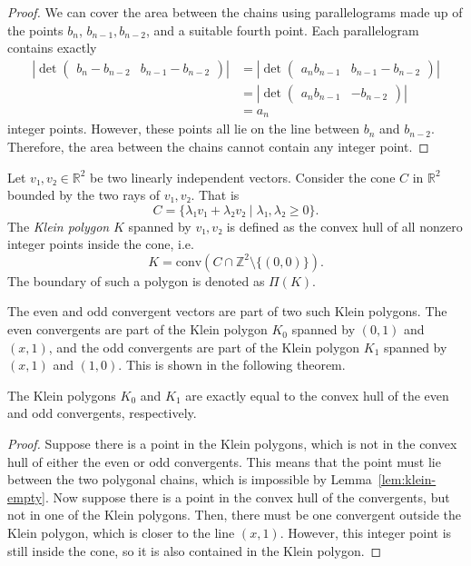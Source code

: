 \begin{proof}
  We can cover the area between the chains
  using parallelograms made up of the points $b_n$, $b_{n-1}, b_{n-2}$, and a suitable fourth point.
  Each parallelogram contains exactly
  \begin{align*}
    |\det\begin{pmatrix}
      b_n - b_{n-2} & b_{n-1} - b_{n-2}
    \end{pmatrix}|
    & = |\det\begin{pmatrix}
      a_n b_{n-1} & b_{n-1} - b_{n-2}
    \end{pmatrix}| \\
    & = |\det\begin{pmatrix}
      a_n b_{n-1} & -b_{n-2}
    \end{pmatrix}| \\
    & = a_n
  \end{align*}
  integer points.
  However, these points all lie on the line between $b_n$ and $b_{n-2}$.
  Therefore, the area between the chains cannot contain any integer point.
\end{proof}

\begin{definition}
  \label{def:klein-polygon}
  Let $v₁, v₂ ∈ ℝ^2$ be two linearly independent vectors.
  Consider the cone $C$ in $ℝ^2$ bounded by the two rays of $v₁, v₂$. That is
  \[
    C = \{ λ₁ v₁ + λ₂ v₂ \mid λ₁, λ₂ ≥ 0 \}.
  \]
  The \emph{Klein polygon} $K$ spanned by $v₁, v₂$ is defined as the convex hull
  of all nonzero integer points inside the cone, i.e.
  \[
    K = \mathrm{conv}(C ∩ ℤ^2 \setminus \{(0, 0)\}).
  \]
  The boundary of such a polygon is denoted as $Π(K)$.
\end{definition}

The even and odd convergent vectors are part of two such Klein polygons.
The even convergents are part of the Klein polygon $K_0$ spanned by $(0, 1)$ and $(x, 1)$,
and the odd convergents are part of the Klein polygon $K_1$ spanned by $(x, 1)$ and $(1, 0)$.
This is shown in the following theorem.

\begin{theorem}
  The Klein polygons $K_0$ and $K_1$ are exactly equal to the
  convex hull of the even and odd convergents, respectively.
\end{theorem}

\begin{proof}
  Suppose there is a point in the Klein polygons,
  which is not in the convex hull of either the even or odd convergents.
  This means that the point must lie between the two polygonal chains,
  which is impossible by Lemma~\ref{lem:klein-empty}.
  Now suppose there is a point in the convex hull of the convergents,
  but not in one of the Klein polygons.
  Then, there must be one convergent outside the Klein polygon,
  which is closer to the line $(x, 1)$.
  However, this integer point is still inside the cone,
  so it is also contained in the Klein polygon.
\end{proof}

